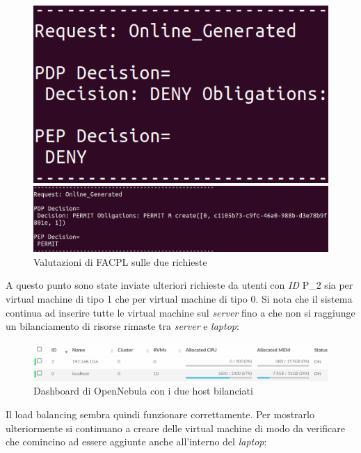 \begin{figure}[H]
    \begin{minipage}{0.27\textwidth}
        \centering
        \includegraphics[width=\textwidth]{tesi_screenshot/DenyP1_1_cut.png}
    \end{minipage}
    \begin{minipage}{0.72\textwidth}
        \centering
        \includegraphics[width=\textwidth]{tesi_screenshot/Permit_P2_1.png}
    \end{minipage}
    \caption{Valutazioni di FACPL sulle due richieste}
\end{figure}
A questo punto sono state inviate ulteriori richieste da utenti con \emph{ID} P\_2 sia per virtual machine di tipo 1 che per virtual machine di tipo 0. Si nota che il sistema continua ad inserire tutte le virtual machine sul \emph{server} fino a che non si raggiunge un bilanciamento di risorse rimaste tra \emph{server} e \emph{laptop}:
\begin{figure}[H]
    \centering
    \includegraphics[width=\textwidth]{tesi_screenshot/OpenNebula_eavenLoad.png}
    \caption{Dashboard di OpenNebula con i due host bilanciati}
\end{figure}
Il load balancing sembra quindi funzionare correttamente. Per mostrarlo ulteriormente si continuano a creare delle virtual machine di modo da verificare che comincino ad essere aggiunte anche all'interno del \emph{laptop}:
